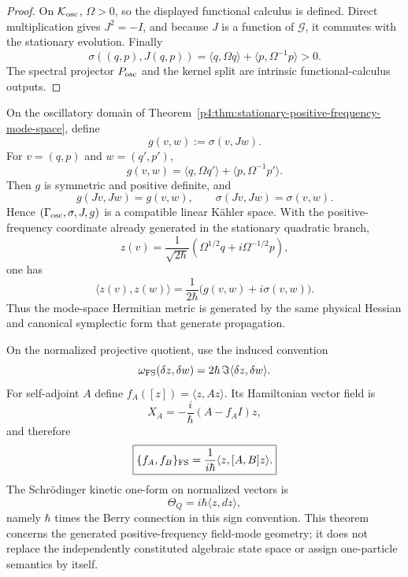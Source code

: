\documentclass[12pt,a4paper]{article}
\begin{document}
\begin{proof}
On \(\mathcal K_{\rm osc}\), \(\Omega>0\), so the displayed functional
calculus is defined.  Direct multiplication gives \(J^2=-I\), and because
\(J\) is a function of \(\mathcal G\), it commutes with the stationary
evolution.  Finally
\[
 \sigma((q,p),J(q,p))
 =\langle q,\Omega q\rangle+\langle p,\Omega^{-1}p\rangle>0.
\]
The spectral projector \(P_{\rm osc}\) and the kernel split are intrinsic
functional-calculus outputs.
\end{proof}


\begin{theorem}
\label{p4:thm:v245-hessian-kahler-projective-geometry}
On the oscillatory domain of
Theorem~\ref{p4:thm:stationary-positive-frequency-mode-space}, define
\[
 g(v,w):=\sigma(v,Jw).
\]
For \(v=(q,p)\) and \(w=(q',p')\),
\[
 \boxed{
 g(v,w)=\langle q,\Omega q'\rangle
       +\langle p,\Omega^{-1}p'\rangle.}
\]
Then \(g\) is symmetric and positive definite, and
\[
 g(Jv,Jw)=g(v,w),\qquad \sigma(Jv,Jw)=\sigma(v,w).
\]
Hence \((\Gamma_{\rm osc},\sigma,J,g)\) is a compatible linear Kähler
space.  With the positive-frequency coordinate already generated in the
stationary quadratic branch,
\[
 z(v)=\frac1{\sqrt{2\hbar}}
 \left(\Omega^{1/2}q+i\Omega^{-1/2}p\right),
\]
one has
\[
 \boxed{
 \langle z(v),z(w)\rangle
 =\frac1{2\hbar}\bigl(g(v,w)+i\sigma(v,w)\bigr).}
\]
Thus the mode-space Hermitian metric is generated by the same physical
Hessian and canonical symplectic form that generate propagation.

On the normalized projective quotient, use the induced convention
\[
 \omega_{\rm FS}(\delta z,\delta w)
 =2\hbar\,\Im\langle\delta z,\delta w\rangle.
\]
For self-adjoint \(A\) define \(f_A([z])=\langle z,Az\rangle\).  Its
Hamiltonian vector field is
\[
 X_A=-\frac{i}{\hbar}(A-f_AI)z,
\]
and therefore
\[
 \boxed{\{f_A,f_B\}_{\rm FS}
 =\frac1{i\hbar}\langle z,[A,B]z\rangle.}
\]
The Schrödinger kinetic one-form on normalized vectors is
\[
 \boxed{\Theta_Q=i\hbar\langle z,dz\rangle,}
\]
namely \(\hbar\) times the Berry connection in this sign convention.
This theorem concerns the generated positive-frequency field-mode geometry;
it does not replace the independently constituted algebraic state space or
assign one-particle semantics by itself.
\end{theorem}
\end{document}
